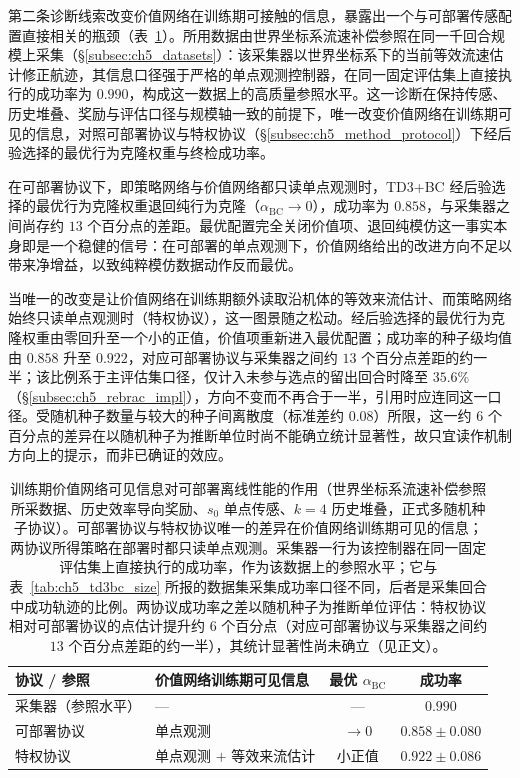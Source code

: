 第二条诊断线索改变价值网络在训练期可接触的信息，暴露出一个与可部署传感配置直接相关的瓶颈（表~\ref{tab:ch5_td3bc_worldcomp}）。所用数据由世界坐标系流速补偿参照在同一千回合规模上采集（\S\ref{subsec:ch5_datasets}）：该采集器以世界坐标系下的当前等效流速估计修正航迹，其信息口径强于严格的单点观测控制器，在同一固定评估集上直接执行的成功率为 $0.990$，构成这一数据上的高质量参照水平。这一诊断在保持传感、历史堆叠、奖励与评估口径与规模轴一致的前提下，唯一改变价值网络在训练期可见的信息，对照可部署协议与特权协议（\S\ref{subsec:ch5_method_protocol}）下经后验选择的最优行为克隆权重与终检成功率。

在可部署协议下，即策略网络与价值网络都只读单点观测时，TD3+BC 经后验选择的最优行为克隆权重退回纯行为克隆（$\alpha_{\mathrm{BC}}\to 0$），成功率为 $0.858$，与采集器之间尚存约 $13$ 个百分点的差距。最优配置完全关闭价值项、退回纯模仿这一事实本身即是一个稳健的信号：在可部署的单点观测下，价值网络给出的改进方向不足以带来净增益，以致纯粹模仿数据动作反而最优。

当唯一的改变是让价值网络在训练期额外读取沿机体的等效来流估计、而策略网络始终只读单点观测时（特权协议），这一图景随之松动。经后验选择的最优行为克隆权重由零回升至一个小的正值，价值项重新进入最优配置；成功率的种子级均值由 $0.858$ 升至 $0.922$，对应可部署协议与采集器之间约 $13$ 个百分点差距的约一半；该比例系于主评估集口径，仅计入未参与选点的留出回合时降至 $35.6\%$（\S\ref{subsec:ch5_rebrac_impl}），方向不变而不再合于一半，引用时应连同这一口径。受随机种子数量与较大的种子间离散度（标准差约 $0.08$）所限，这一约 $6$ 个百分点的差异在以随机种子为推断单位时尚不能确立统计显著性，故只宜读作机制方向上的提示，而非已确证的效应。

\begin{table}[t]
\centering
\caption{训练期价值网络可见信息对可部署离线性能的作用（世界坐标系流速补偿参照所采数据、历史效率导向奖励、$s_0$ 单点传感、$k=4$ 历史堆叠，正式多随机种子协议）。可部署协议与特权协议唯一的差异在价值网络训练期可见的信息；两协议所得策略在部署时都只读单点观测。采集器一行为该控制器在同一固定评估集上直接执行的成功率，作为该数据上的参照水平；它与表~\ref{tab:ch5_td3bc_size} 所报的数据集采集成功率口径不同，后者是采集回合中成功轨迹的比例。两协议成功率之差以随机种子为推断单位评估：特权协议相对可部署协议的点估计提升约 $6$ 个百分点（对应可部署协议与采集器之间约 $13$ 个百分点差距的约一半），其统计显著性尚未确立（见正文）。}
\label{tab:ch5_td3bc_worldcomp}
\begin{tabular}{l l c c}
\toprule
\textbf{协议 / 参照} & \textbf{价值网络训练期可见信息} & \textbf{最优 $\alpha_{\mathrm{BC}}$} & \textbf{成功率} \\
\midrule
采集器（参照水平） & --- & --- & $0.990$ \\
可部署协议 & 单点观测 & $\to 0$ & $0.858 \pm 0.080$ \\
特权协议 & 单点观测 $+$ 等效来流估计 & 小正值 & $0.922 \pm 0.086$ \\
\bottomrule
\end{tabular}
\end{table}

